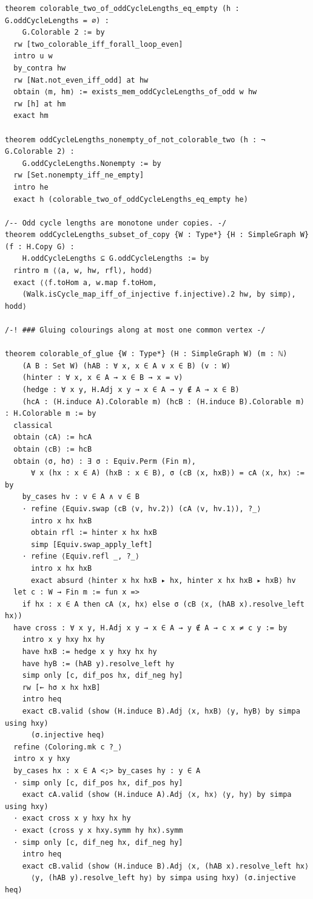 \begin{verbatim}
theorem colorable_two_of_oddCycleLengths_eq_empty (h : G.oddCycleLengths = ∅) :
    G.Colorable 2 := by
  rw [two_colorable_iff_forall_loop_even]
  intro u w
  by_contra hw
  rw [Nat.not_even_iff_odd] at hw
  obtain ⟨m, hm⟩ := exists_mem_oddCycleLengths_of_odd w hw
  rw [h] at hm
  exact hm

theorem oddCycleLengths_nonempty_of_not_colorable_two (h : ¬ G.Colorable 2) :
    G.oddCycleLengths.Nonempty := by
  rw [Set.nonempty_iff_ne_empty]
  intro he
  exact h (colorable_two_of_oddCycleLengths_eq_empty he)

/-- Odd cycle lengths are monotone under copies. -/
theorem oddCycleLengths_subset_of_copy {W : Type*} {H : SimpleGraph W} (f : H.Copy G) :
    H.oddCycleLengths ⊆ G.oddCycleLengths := by
  rintro m ⟨⟨a, w, hw, rfl⟩, hodd⟩
  exact ⟨⟨f.toHom a, w.map f.toHom,
    (Walk.isCycle_map_iff_of_injective f.injective).2 hw, by simp⟩, hodd⟩

/-! ### Gluing colourings along at most one common vertex -/

theorem colorable_of_glue {W : Type*} (H : SimpleGraph W) (m : ℕ)
    (A B : Set W) (hAB : ∀ x, x ∈ A ∨ x ∈ B) (v : W)
    (hinter : ∀ x, x ∈ A → x ∈ B → x = v)
    (hedge : ∀ x y, H.Adj x y → x ∈ A → y ∉ A → x ∈ B)
    (hcA : (H.induce A).Colorable m) (hcB : (H.induce B).Colorable m) : H.Colorable m := by
  classical
  obtain ⟨cA⟩ := hcA
  obtain ⟨cB⟩ := hcB
  obtain ⟨σ, hσ⟩ : ∃ σ : Equiv.Perm (Fin m),
      ∀ x (hx : x ∈ A) (hxB : x ∈ B), σ (cB ⟨x, hxB⟩) = cA ⟨x, hx⟩ := by
    by_cases hv : v ∈ A ∧ v ∈ B
    · refine ⟨Equiv.swap (cB ⟨v, hv.2⟩) (cA ⟨v, hv.1⟩), ?_⟩
      intro x hx hxB
      obtain rfl := hinter x hx hxB
      simp [Equiv.swap_apply_left]
    · refine ⟨Equiv.refl _, ?_⟩
      intro x hx hxB
      exact absurd ⟨hinter x hx hxB ▸ hx, hinter x hx hxB ▸ hxB⟩ hv
  let c : W → Fin m := fun x =>
    if hx : x ∈ A then cA ⟨x, hx⟩ else σ (cB ⟨x, (hAB x).resolve_left hx⟩)
  have cross : ∀ x y, H.Adj x y → x ∈ A → y ∉ A → c x ≠ c y := by
    intro x y hxy hx hy
    have hxB := hedge x y hxy hx hy
    have hyB := (hAB y).resolve_left hy
    simp only [c, dif_pos hx, dif_neg hy]
    rw [← hσ x hx hxB]
    intro heq
    exact cB.valid (show (H.induce B).Adj ⟨x, hxB⟩ ⟨y, hyB⟩ by simpa using hxy)
      (σ.injective heq)
  refine ⟨Coloring.mk c ?_⟩
  intro x y hxy
  by_cases hx : x ∈ A <;> by_cases hy : y ∈ A
  · simp only [c, dif_pos hx, dif_pos hy]
    exact cA.valid (show (H.induce A).Adj ⟨x, hx⟩ ⟨y, hy⟩ by simpa using hxy)
  · exact cross x y hxy hx hy
  · exact (cross y x hxy.symm hy hx).symm
  · simp only [c, dif_neg hx, dif_neg hy]
    intro heq
    exact cB.valid (show (H.induce B).Adj ⟨x, (hAB x).resolve_left hx⟩
      ⟨y, (hAB y).resolve_left hy⟩ by simpa using hxy) (σ.injective heq)


\end{verbatim}
